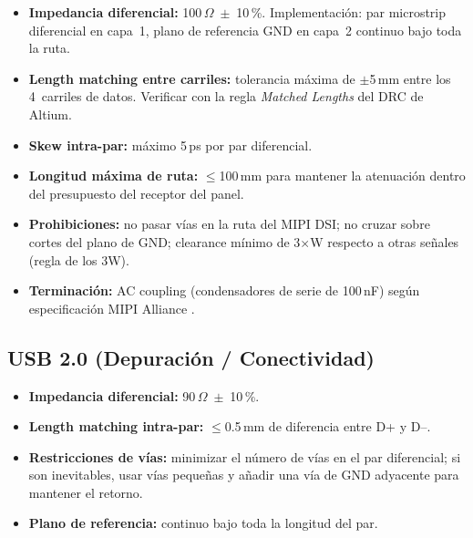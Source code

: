 \begin{sibox}
  \begin{itemize}
    \item \textbf{Impedancia diferencial:} 100\,$\Omega$~$\pm$~10\,\%.
      Implementación: par microstrip diferencial en capa~1, plano de referencia
      GND en capa~2 continuo bajo toda la ruta.
    \item \textbf{Length matching entre carriles:} tolerancia máxima de
      $\pm$5\,mm entre los 4~carriles de datos. Verificar con la regla
      \textit{Matched Lengths} del DRC de Altium.
    \item \textbf{Skew intra-par:} máximo 5\,ps por par diferencial.
    \item \textbf{Longitud máxima de ruta:} $\leq$100\,mm para mantener la
      atenuación dentro del presupuesto del receptor del panel.
    \item \textbf{Prohibiciones:} no pasar vías en la ruta del MIPI DSI;
      no cruzar sobre cortes del plano de GND; clearance mínimo de 3$\times$W
      respecto a otras señales (regla de los 3W).
    \item \textbf{Terminación:} AC coupling (condensadores de serie de 100\,nF)
      según especificación MIPI Alliance \cite{mipi_dsi}.
  \end{itemize}
\end{sibox}

\subsection{USB 2.0 (Depuración / Conectividad)}
\label{subsec:si_usb}

\begin{sibox}
  \begin{itemize}
    \item \textbf{Impedancia diferencial:} 90\,$\Omega$~$\pm$~10\,\%.
    \item \textbf{Length matching intra-par:} $\leq$0.5\,mm de diferencia
      entre D+ y D--.
    \item \textbf{Restricciones de vías:} minimizar el número de vías en el
      par diferencial; si son inevitables, usar vías pequeñas y añadir una vía
      de GND adyacente para mantener el retorno.
    \item \textbf{Plano de referencia:} continuo bajo toda la longitud del par.
  \end{itemize}
\end{sibox}

